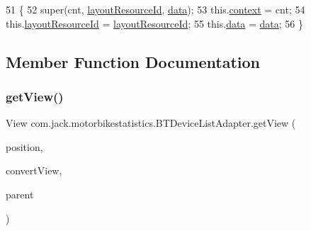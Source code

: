 \begin{DoxyCode}
51                                                                                                 \{
52         super(cnt, \hyperlink{classcom_1_1jack_1_1motorbikestatistics_1_1_b_t_device_list_adapter_a3f7a9f653fb6a0fcda0a0a61e29d0f06}{layoutResourceId}, \hyperlink{classcom_1_1jack_1_1motorbikestatistics_1_1_b_t_device_list_adapter_a7e0dfcd0a703aaecf0c0457515b6984f}{data});
53         this.\hyperlink{classcom_1_1jack_1_1motorbikestatistics_1_1_b_t_device_list_adapter_a6e42efbb29008651704bef82263ae838}{context} = cnt;
54         this.\hyperlink{classcom_1_1jack_1_1motorbikestatistics_1_1_b_t_device_list_adapter_a3f7a9f653fb6a0fcda0a0a61e29d0f06}{layoutResourceId} = \hyperlink{classcom_1_1jack_1_1motorbikestatistics_1_1_b_t_device_list_adapter_a3f7a9f653fb6a0fcda0a0a61e29d0f06}{layoutResourceId};
55         this.\hyperlink{classcom_1_1jack_1_1motorbikestatistics_1_1_b_t_device_list_adapter_a7e0dfcd0a703aaecf0c0457515b6984f}{data} = \hyperlink{classcom_1_1jack_1_1motorbikestatistics_1_1_b_t_device_list_adapter_a7e0dfcd0a703aaecf0c0457515b6984f}{data};
56     \}
\end{DoxyCode}


\subsection{Member Function Documentation}
\mbox{\label{classcom_1_1jack_1_1motorbikestatistics_1_1_b_t_device_list_adapter_ab9e3230f609c8a8195c3e4e9c2b26b2e}} 
\subsubsection{\texorpdfstring{get\+View()}{getView()}}
{\footnotesize\ttfamily View com.\+jack.\+motorbikestatistics.\+B\+T\+Device\+List\+Adapter.\+get\+View (\begin{DoxyParamCaption}\item[{int}]{position,  }\item[{View}]{convert\+View,  }\item[{View\+Group}]{parent }\end{DoxyParamCaption})\hspace{0.3cm}{\ttfamily [inline]}}



